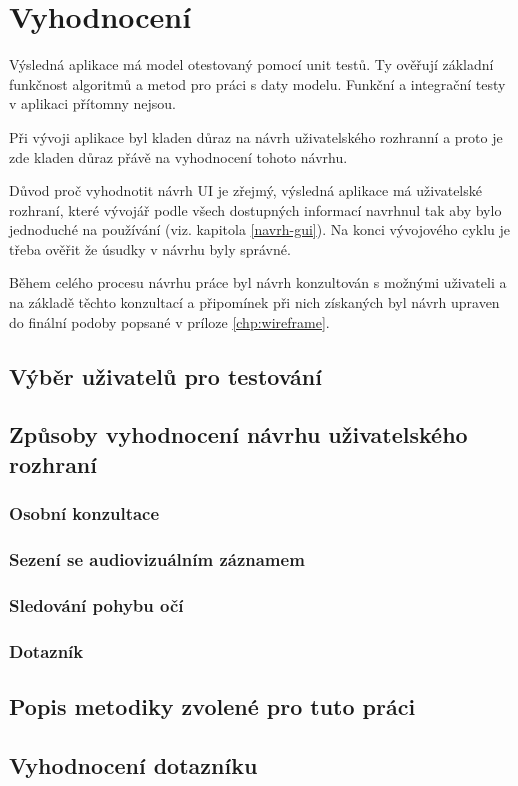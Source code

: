 \chapter{Vyhodnocení}
Výsledná aplikace má model otestovaný pomocí unit testů. Ty ověřují základní funkčnost algoritmů a metod pro práci s daty modelu. Funkční a integrační testy v aplikaci přítomny nejsou.

Při vývoji aplikace byl kladen důraz na návrh uživatelského rozhranní a proto je zde kladen důraz přávě na vyhodnocení tohoto návrhu.

Důvod proč vyhodnotit návrh UI je zřejmý, výsledná aplikace má uživatelské rozhraní, které vývojář podle všech dostupných informací navrhnul tak aby bylo jednoduché na používání (viz. kapitola \ref{navrh-gui}). Na konci vývojového cyklu je třeba ověřit že úsudky v návrhu byly správné.  

Během celého procesu návrhu práce byl návrh konzultován s možnými uživateli a na základě těchto konzultací a připomínek při nich získaných byl návrh upraven do finální podoby popsané v príloze \ref{chp:wireframe}.

\section{Výběr uživatelů pro testování}

\section{Způsoby vyhodnocení návrhu uživatelského rozhraní}
\subsection{Osobní konzultace}
\subsection{Sezení se audiovizuálním záznamem}
\subsection{Sledování pohybu očí}
\subsection{Dotazník}

\section{Popis metodiky zvolené pro tuto práci}

\section{Vyhodnocení dotazníku}
